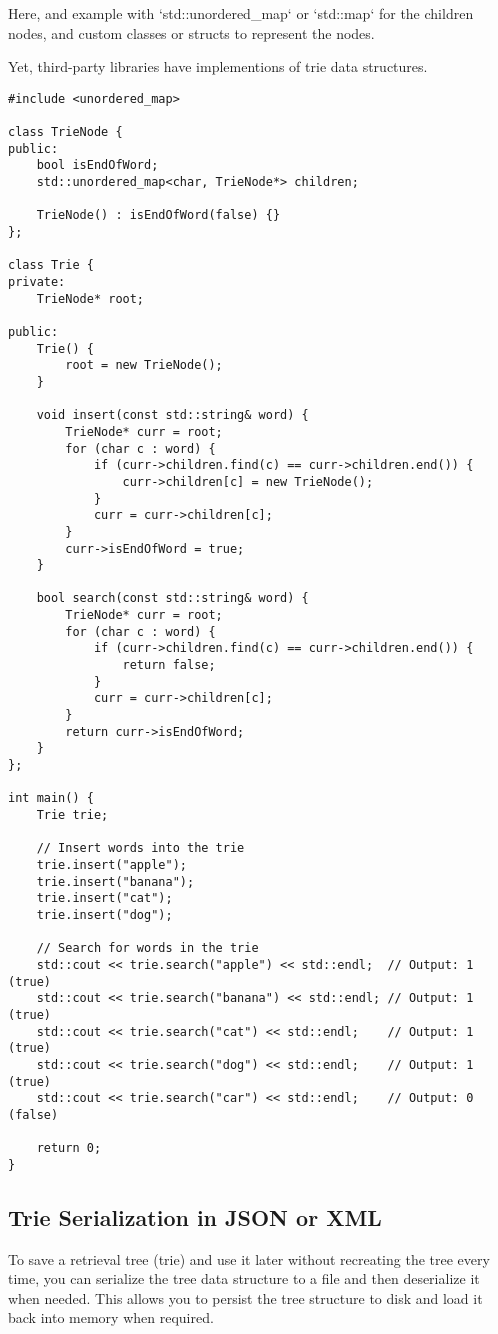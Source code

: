 Here, and example with `std::unordered\_map` or `std::map` for the children nodes,
and custom classes or structs to represent the nodes.

Yet, third-party libraries have implementions of trie data structures.

\begin{verbatim}
#include <unordered_map>

class TrieNode {
public:
    bool isEndOfWord;
    std::unordered_map<char, TrieNode*> children;

    TrieNode() : isEndOfWord(false) {}
};

class Trie {
private:
    TrieNode* root;

public:
    Trie() {
        root = new TrieNode();
    }

    void insert(const std::string& word) {
        TrieNode* curr = root;
        for (char c : word) {
            if (curr->children.find(c) == curr->children.end()) {
                curr->children[c] = new TrieNode();
            }
            curr = curr->children[c];
        }
        curr->isEndOfWord = true;
    }

    bool search(const std::string& word) {
        TrieNode* curr = root;
        for (char c : word) {
            if (curr->children.find(c) == curr->children.end()) {
                return false;
            }
            curr = curr->children[c];
        }
        return curr->isEndOfWord;
    }
};

int main() {
    Trie trie;
    
    // Insert words into the trie
    trie.insert("apple");
    trie.insert("banana");
    trie.insert("cat");
    trie.insert("dog");
    
    // Search for words in the trie
    std::cout << trie.search("apple") << std::endl;  // Output: 1 (true)
    std::cout << trie.search("banana") << std::endl; // Output: 1 (true)
    std::cout << trie.search("cat") << std::endl;    // Output: 1 (true)
    std::cout << trie.search("dog") << std::endl;    // Output: 1 (true)
    std::cout << trie.search("car") << std::endl;    // Output: 0 (false)

    return 0;
}
\end{verbatim}

\subsection{Trie Serialization in JSON or XML}

To save a retrieval tree (trie) and use it later without recreating the tree every time,
you can serialize the tree data structure to a file and then deserialize it when needed.
This allows you to persist the tree structure to disk and load it back into memory when required.

